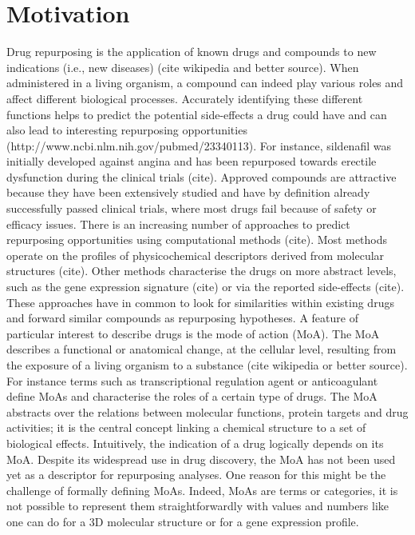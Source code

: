 \documentclass{bioinfo}
\begin{document}
\section{Motivation}

Drug repurposing is the application of known drugs and compounds to new indications (i.e., new diseases) (cite wikipedia and better source). 
When administered in a living organism, a compound can indeed play various roles and affect different biological processes. 
Accurately identifying these different functions helps to predict the potential side-effects a drug could have and can also lead to 
interesting repurposing opportunities (http://www.ncbi.nlm.nih.gov/pubmed/23340113). For instance, sildenafil was initially developed 
against angina and has been repurposed towards erectile dysfunction during the clinical trials (cite). Approved compounds are 
attractive because they have been extensively studied and have by definition already successfully passed clinical trials, where 
most drugs fail because of safety or efficacy issues.
There is an increasing number of approaches to predict repurposing opportunities using computational methods (cite). Most 
methods operate on the profiles of physicochemical descriptors derived from molecular structures (cite). Other methods characterise 
the drugs on more abstract levels, such as the gene expression signature (cite) or via the reported side-effects (cite). These approaches 
have in common to look for similarities within existing drugs and forward similar compounds as repurposing hypotheses.
A feature of particular interest to describe drugs is the mode of action (MoA). The MoA describes a functional or anatomical change, 
at the cellular level, resulting from the exposure of a living organism to a substance (cite wikipedia or better source). For instance 
terms such as transcriptional regulation agent or anticoagulant define MoAs and characterise the roles of a certain type of drugs. The 
MoA abstracts over the relations between molecular functions, protein targets and drug activities; it is the central concept linking a 
chemical structure to a set of biological effects. Intuitively, the indication of a drug logically depends on its MoA.
Despite its widespread use in drug discovery, the MoA has not been used yet as a descriptor for repurposing analyses. One reason for this 
might be the challenge of formally defining MoAs. Indeed, MoAs are terms or categories, it is not possible to represent 
them straightforwardly with values and numbers like one can do for a 3D molecular structure or for a gene expression profile. 
\end{document}
